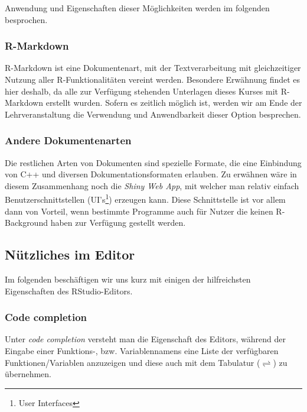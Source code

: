 \documentclass[]{article}
\let\rmarkdownfootnote\footnote%
\def\footnote{\protect\rmarkdownfootnote}
\begin{document}
Anwendung und Eigenschaften dieser Möglichkeiten werden im folgenden
besprochen.

\subsubsection*{R-Markdown}\label{r-markdown}

R-Markdown ist eine Dokumentenart, mit der Textverarbeitung mit
gleichzeitiger Nutzung aller R-Funktionalitäten vereint werden.
Besondere Erwähnung findet es hier deshalb, da alle zur Verfügung
stehenden Unterlagen dieses Kurses mit R-Markdown erstellt wurden.
Sofern es zeitlich möglich ist, werden wir am Ende der Lehrveranstaltung
die Verwendung und Anwendbarkeit dieser Option besprechen.

\subsubsection*{Andere Dokumentenarten}\label{andere-dokumentenarten}

Die restlichen Arten von Dokumenten sind spezielle Formate, die eine
Einbindung von C++ und diversen Dokumentationsformaten erlauben. Zu
erwähnen wäre in diesem Zusammenhang noch die \emph{Shiny Web App}, mit
welcher man relativ einfach Benutzerschnittstellen (UI's\footnote{User
  Interfaces}) erzeugen kann. Diese Schnittstelle ist vor allem dann von
Vorteil, wenn bestimmte Programme auch für Nutzer die keinen
R-Background haben zur Verfügung gestellt werden.

\subsection*{Nützliches im Editor}\label{nutzliches-im-editor}

Im folgenden beschäftigen wir uns kurz mit einigen der hilfreichsten
Eigenschaften des RStudio-Editors.

\subsubsection*{Code completion}\label{code-completion}

Unter \emph{code completion} versteht man die Eigenschaft des Editors,
während der Eingabe einer Funktions-, bzw. Variablennamens eine Liste
der verfügbaren Funktionen/Variablen anzuzeigen und diese auch mit dem
Tabulatur (\(\rightleftharpoons\)) zu übernehmen.
\end{document}
